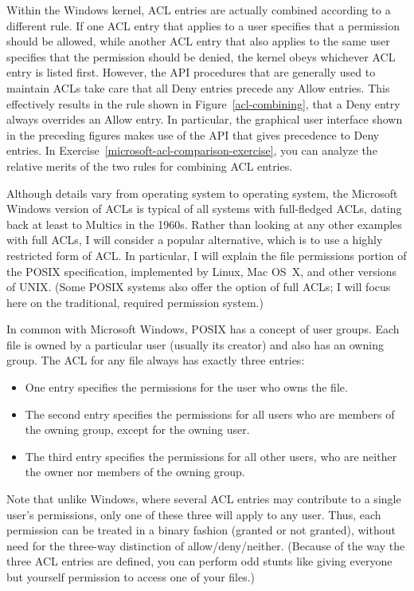 Within the Windows kernel, ACL entries are actually combined according to a
different rule.  If one ACL entry that applies to a user specifies that a
permission should be allowed, while another ACL entry that also
applies to the same user specifies that the permission should be
denied, the kernel obeys whichever ACL entry is listed first.
However, the API procedures that are generally used to maintain ACLs
take care that all Deny entries precede any Allow entries.  This effectively
results in the rule shown in Figure~\ref{acl-combining}, that a Deny
entry always overrides an Allow entry.  In particular, the graphical
user interface shown in the preceding figures makes use of the API
that gives precedence to Deny entries.  In
Exercise~\ref{microsoft-acl-comparison-exercise}, you can analyze the
relative merits of the two rules for combining ACL entries.

Although details vary from operating system to operating system, the
Microsoft Windows version of ACLs is typical of all systems with
full-fledged ACLs, dating back at least to Multics in the 1960s.
Rather than looking at any other examples with full ACLs, I will
consider a popular alternative, which is to use a highly restricted
form of ACL.  In particular, I will explain the file permissions
portion of the POSIX specification, implemented by Linux, Mac OS~X,
and other versions of UNIX.  (Some POSIX systems also offer the option
of full ACLs; I will focus here on the traditional, required
permission system.)

In common with Microsoft Windows, POSIX has a concept of user groups.
Each file is owned by a particular user (usually its creator) and
also has an owning group.  The ACL for any file always has exactly
three entries:
\begin{itemize}
\item
One entry specifies the permissions for the user who owns the file.
\item
The second entry specifies the permissions for all users who are members
of the owning group, except for the owning user.
\item
The third entry specifies the permissions for all other users, who are
neither the owner nor members of the owning group.
\end{itemize}
Note that unlike Windows, where several ACL entries may contribute to
a single user's permissions, only one of these three will apply to any
user.  Thus, each permission can be treated in a binary fashion
(granted or not granted), without need for the three-way distinction
of allow/deny/neither.  (Because of the way the three ACL entries are
defined, you can perform odd stunts like giving everyone but yourself
permission to access one of your files.)

